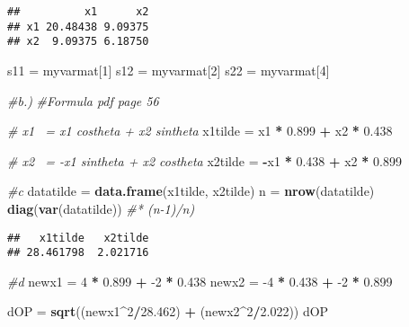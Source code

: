 \documentclass[
]{article}
\newenvironment{Shaded}{\begin{snugshade}}{\end{snugshade}}
\newcommand{\CommentTok}[1]{\textcolor[rgb]{0.56,0.35,0.01}{\textit{#1}}}
\newcommand{\DecValTok}[1]{\textcolor[rgb]{0.00,0.00,0.81}{#1}}
\newcommand{\FloatTok}[1]{\textcolor[rgb]{0.00,0.00,0.81}{#1}}
\newcommand{\KeywordTok}[1]{\textcolor[rgb]{0.13,0.29,0.53}{\textbf{#1}}}
\newcommand{\NormalTok}[1]{#1}
\newcommand{\OperatorTok}[1]{\textcolor[rgb]{0.81,0.36,0.00}{\textbf{#1}}}
\newcommand{\StringTok}[1]{\textcolor[rgb]{0.31,0.60,0.02}{#1}}
\begin{document}
\begin{verbatim}
##          x1      x2
## x1 20.48438 9.09375
## x2  9.09375 6.18750
\end{verbatim}

\begin{Shaded}
\begin{Highlighting}[]
\NormalTok{s11 =}\StringTok{ }\NormalTok{myvarmat[}\DecValTok{1}\NormalTok{]}
\NormalTok{s12 =}\StringTok{ }\NormalTok{myvarmat[}\DecValTok{2}\NormalTok{]}
\NormalTok{s22 =}\StringTok{ }\NormalTok{myvarmat[}\DecValTok{4}\NormalTok{]}
\end{Highlighting}
\end{Shaded}

\begin{Shaded}
\begin{Highlighting}[]
\CommentTok{#b.) }
\CommentTok{#Formula pdf page 56}

\CommentTok{# x1~ = x1 costheta + x2 sintheta}
\NormalTok{x1tilde =}\StringTok{ }\NormalTok{x1 }\OperatorTok{*}\StringTok{ }\FloatTok{0.899} \OperatorTok{+}\StringTok{ }\NormalTok{x2 }\OperatorTok{*}\StringTok{ }\FloatTok{0.438}

\CommentTok{# x2~ = -x1 sintheta + x2 costheta}
\NormalTok{x2tilde =}\StringTok{ }\OperatorTok{-}\NormalTok{x1 }\OperatorTok{*}\StringTok{ }\FloatTok{0.438} \OperatorTok{+}\StringTok{ }\NormalTok{x2 }\OperatorTok{*}\StringTok{ }\FloatTok{0.899}

\CommentTok{#c }
\NormalTok{datatilde =}\StringTok{ }\KeywordTok{data.frame}\NormalTok{(x1tilde, x2tilde)}
\NormalTok{n =}\StringTok{ }\KeywordTok{nrow}\NormalTok{(datatilde)}
\KeywordTok{diag}\NormalTok{(}\KeywordTok{var}\NormalTok{(datatilde))  }\CommentTok{#* (n-1)/n)}
\end{Highlighting}
\end{Shaded}

\begin{verbatim}
##   x1tilde   x2tilde 
## 28.461798  2.021716
\end{verbatim}

\begin{Shaded}
\begin{Highlighting}[]
\CommentTok{#d}
\NormalTok{newx1 =}\StringTok{ }\DecValTok{4} \OperatorTok{*}\StringTok{ }\FloatTok{0.899} \OperatorTok{+}\StringTok{ }\DecValTok{-2} \OperatorTok{*}\StringTok{ }\FloatTok{0.438}
\NormalTok{newx2 =}\StringTok{ }\DecValTok{-4} \OperatorTok{*}\StringTok{ }\FloatTok{0.438} \OperatorTok{+}\StringTok{ }\DecValTok{-2} \OperatorTok{*}\StringTok{ }\FloatTok{0.899}

\NormalTok{dOP =}\StringTok{ }\KeywordTok{sqrt}\NormalTok{((newx1}\OperatorTok{^}\DecValTok{2}\OperatorTok{/}\FloatTok{28.462}\NormalTok{) }\OperatorTok{+}\StringTok{ }\NormalTok{(newx2}\OperatorTok{^}\DecValTok{2}\OperatorTok{/}\FloatTok{2.022}\NormalTok{))}
\NormalTok{dOP}
\end{Highlighting}
\end{Shaded}
\end{document}
